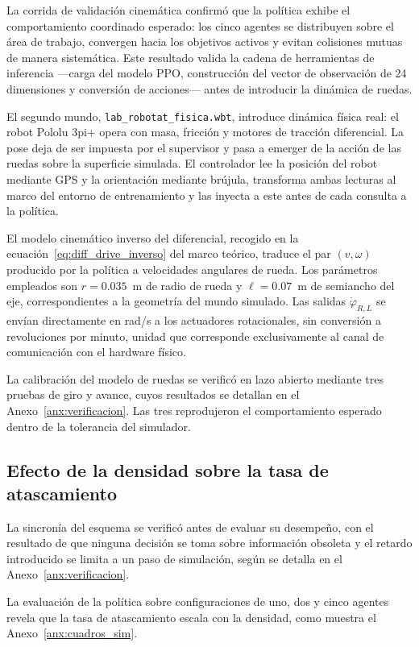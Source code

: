 La corrida de validación cinemática confirmó que la política exhibe el
comportamiento coordinado esperado: los cinco agentes se distribuyen sobre el área de trabajo, convergen hacia los objetivos activos y evitan colisiones mutuas de
manera sistemática. Este resultado valida la cadena de herramientas de
inferencia —carga del modelo PPO, construcción del vector de observación de
24 dimensiones y conversión de acciones— antes de introducir la dinámica de
ruedas.


El segundo mundo, \texttt{lab\_robotat\_fisica.wbt}, introduce dinámica física
real: el robot Pololu 3pi+ opera con masa, fricción y motores de tracción
diferencial. La pose deja de ser impuesta por el supervisor y pasa a
emerger de la acción de las ruedas sobre la superficie simulada. El
controlador lee la posición del robot mediante GPS y la orientación mediante brújula, transforma ambas lecturas al marco del entorno de
entrenamiento y las inyecta a este antes de cada consulta a la política.

El modelo cinemático inverso del diferencial, recogido en la
ecuación~\eqref{eq:diff_drive_inverso} del marco teórico, traduce el par
$(v, \omega)$ producido por la política a velocidades angulares de rueda. Los
parámetros empleados son $r = 0{.}035$~m de radio de rueda y
$\ell = 0{.}07$~m de semiancho del eje, correspondientes a la geometría del
mundo simulado. Las salidas
$\dot{\varphi}_{R,L}$ se envían directamente en rad/s a los actuadores
rotacionales, sin conversión a revoluciones por minuto, unidad que corresponde
exclusivamente al canal de comunicación con el hardware físico.

La calibración del modelo de ruedas se verificó en lazo abierto mediante tres
pruebas de giro y avance, cuyos resultados se detallan en el
Anexo~\ref{anx:verificacion}. Las tres reprodujeron el comportamiento esperado
dentro de la tolerancia del simulador.

\subsection*{Efecto de la densidad sobre la tasa de atascamiento}

La sincronía del esquema se verificó antes de evaluar su desempeño, con el
resultado de que ninguna decisión se toma sobre información obsoleta y el
retardo introducido se limita a un paso de simulación, según se detalla en el
Anexo~\ref{anx:verificacion}.


La evaluación de la política sobre configuraciones de uno, dos y cinco agentes
revela que la tasa de atascamiento escala con la densidad, como muestra el
Anexo~\ref{anx:cuadros_sim}.

